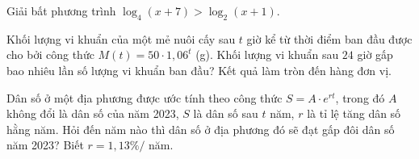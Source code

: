 \begin{bt}%

	Giải bất phương trình $\log_4 (x+7)>\log_2 (x+1)$.
\end{bt}

\begin{bt}%

	Khối lượng vi khuẩn của một mẻ nuôi cấy sau $ t$ giờ kể từ thời điểm ban đầu được cho bởi công thức $M(t)=50\cdot 1{,}06^t$ (g). Khối lượng vi khuẩn sau $24$ giờ gấp bao nhiêu lần số lượng vi khuẩn ban đầu? Kết quả làm tròn đến hàng đơn vị.
\end{bt}

\begin{bt}%

	Dân số ở một địa phương được ước tính theo công thức $S=A\cdot e^{rt}$, trong đó $A$ không đổi là dân số của năm 2023, $S$ là dân số sau $t$ năm, $r$ là tỉ lệ tăng dân số hằng năm. Hỏi đến năm nào thì dân số ở địa phương đó sẽ đạt gấp đôi dân số năm 2023? Biết $r=1,13\% /$ năm.
\end{bt}

